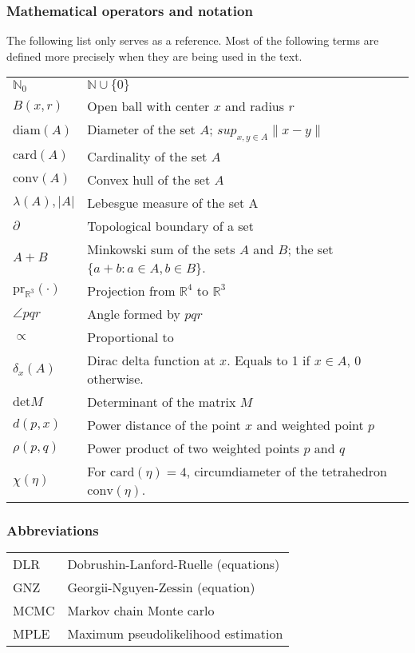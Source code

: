 \documentclass[12pt,a4paper]{report}
\newcommand{\Rt}{{\mathbb R^3}}
\theoremstyle{definition}
\theoremstyle{remark}
\theoremstyle{theorem}
\theoremstyle{remark}
\begin{document}



\tableofcontents



\subsubsection{Mathematical operators and notation}
The following list only serves as a reference. Most of the following terms are defined more precisely when they are being used in the text.

\begin{tabular}{ l l }
	$\mathbb N_0$ & $\mathbb N \cup \{0\}$ \\
	$B(x,r)$ & Open ball with center $x$ and radius $r$ \\
	$\mathrm{diam}(A)$ & Diameter of the set $A$; $sup_{x,y\in A}\|x-y\|$ \\
	$\mathrm{card}(A)$ & Cardinality of the set $A$ \\
	$\mathrm{conv}(A)$ & Convex hull of the set $A$ \\
	$\lambda(A), |A|$ & Lebesgue measure of the set A \\
	$\partial$ & Topological boundary of a set \\
	$A+B$ & Minkowski sum of the sets $A$ and $B$; the set $\{a+b: a\in A, b\in B\}$. \\
	$\mathrm{pr}_{\Rt}(\cdot)$ & Projection from $\mathbb R^4$ to $\Rt$ \\
	$\angle pqr$ & Angle formed by $pqr$ \\
	$\propto$ & Proportional to \\
	$\delta_x(A)$ & Dirac delta function at $x$. Equals to 1 if $x\in A$, 0 otherwise.\\ 
	$\mathrm{det} M$ & Determinant of the matrix $M$ \\
	$d(p,x)$ & Power distance of the point $x$ and weighted point $p$ \\
	$\rho(p,q)$ & Power product of two weighted points $p$ and $q$ \\
	$\chi(\eta)$ & For $\mathrm{card}(\eta)=4$, circumdiameter of the tetrahedron $\mathrm{conv}(\eta)$.\\
\end{tabular}




\subsubsection{Abbreviations}
\begin{tabular}{ l l }
	DLR & Dobrushin-Lanford-Ruelle (equations) \\
	GNZ & Georgii-Nguyen-Zessin (equation) \\
	MCMC & Markov chain Monte carlo \\
	MPLE & Maximum pseudolikelihood estimation
\end{tabular}
\end{document}
